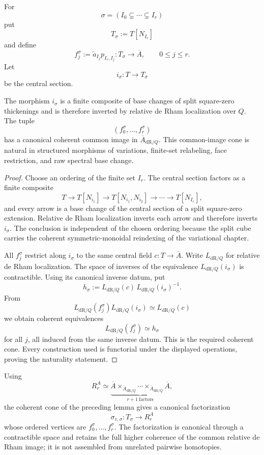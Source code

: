 For
\[
\sigma=(I_0\subsetneq\cdots\subsetneq I_r)
\]
put
\[
T_\sigma:=T[N_{I_r}]
\]
and define
\[
f_j^\sigma
:=
\widetilde a_{I_j}p_{I_r,I_j}
:
T_\sigma\longrightarrow\overline A,
\qquad
0\le j\le r.
\]
Let
\[
i_\sigma:T\longrightarrow T_\sigma
\]
be the central section.

\begin{lemma}
\label{lem:symmetry-noether-coherent-de-rham-cone-for-a-face-chain}
The morphism $i_\sigma$ is a finite composite of base changes of split square-zero
thickenings and is therefore inverted by relative de Rham localization over $Q$.
The tuple
\[
(f_0^\sigma,\ldots,f_r^\sigma)
\]
has a canonical coherent common image in $\overline A_{\mathrm{dR}/Q}$.
This common-image cone is natural in structured morphisms of variations, finite-set
relabeling, face restriction, and raw spectral base change.
\end{lemma}

\begin{proof}
Choose an ordering of the finite set $I_r$.  The central section factors as a
finite composite
\[
T\longrightarrow T[N_{i_1}]
\longrightarrow T[N_{i_1},N_{i_2}]
\longrightarrow\cdots\longrightarrow T[N_{I_r}],
\]
and every arrow is a base change of the central section of a split square-zero
extension.  Relative de Rham localization inverts each arrow and therefore
inverts $i_\sigma$.  The conclusion is independent of the chosen ordering because
the split cube carries the coherent symmetric-monoidal reindexing of the
variational chapter.

All $f_j^\sigma$ restrict along $i_\sigma$ to the same central field $c:T\to
\overline A$.  Write $L_{\mathrm{dR}/Q}$ for relative de Rham localization.  The
space of inverses of the equivalence $L_{\mathrm{dR}/Q}(i_\sigma)$ is
contractible.  Using its canonical inverse datum, put
\[
h_\sigma
:=
L_{\mathrm{dR}/Q}(c)\,
L_{\mathrm{dR}/Q}(i_\sigma)^{-1}.
\]
From
\[
L_{\mathrm{dR}/Q}(f_j^\sigma)
L_{\mathrm{dR}/Q}(i_\sigma)
\simeq
L_{\mathrm{dR}/Q}(c)
\]
we obtain coherent equivalences
\[
L_{\mathrm{dR}/Q}(f_j^\sigma)\simeq h_\sigma
\]
for all $j$, all induced from the same inverse datum.  This is the required
coherent cone.  Every construction used is functorial under the displayed
operations, proving the naturality statement.
\end{proof}

\begin{construction}
\label{constr:symmetry-noether-canonical-relation-simplex-of-a-face-chain}
Using
\[
R^A_r
\simeq
\underbrace{
\overline A\times_{\overline A_{\mathrm{dR}/Q}}\cdots
\times_{\overline A_{\mathrm{dR}/Q}}\overline A
}_{r+1\ \mathrm{factors}},
\]
the coherent cone of the preceding lemma gives a canonical factorization
\[
\boxed{
\sigma_{v,\sigma}:
T_\sigma\longrightarrow R^A_r
}
\]
whose ordered vertices are $f_0^\sigma,\ldots,f_r^\sigma$.  The factorization is
canonical through a contractible space and retains the full higher coherence of
the common relative de Rham image; it is not assembled from unrelated pairwise
homotopies.
\end{construction}

